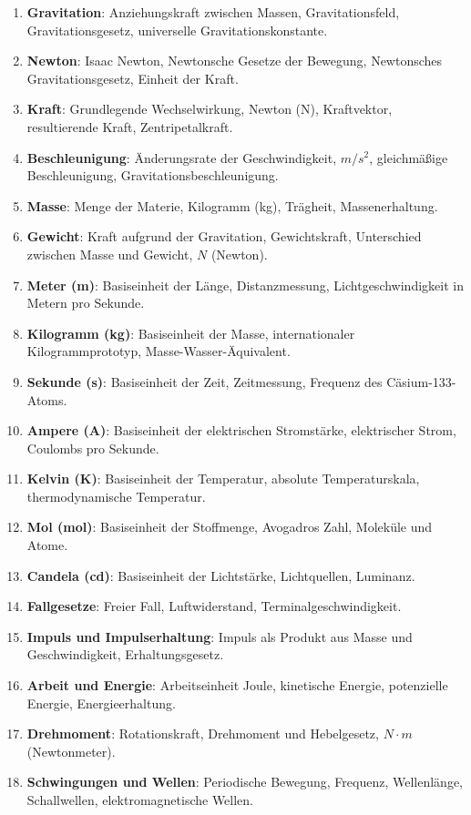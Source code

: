 \documentclass{vorlage-design-main}
\begin{document}
\begin{enumerate}
\def\labelenumi{\arabic{enumi}.}

\item
  \textbf{Gravitation}: Anziehungskraft zwischen Massen,
  Gravitationsfeld, Gravitationsgesetz, universelle
  Gravitationskonstante.
\item
  \textbf{Newton}: Isaac Newton, Newtonsche Gesetze der Bewegung,
  Newtonsches Gravitationsgesetz, Einheit der Kraft.
\item
  \textbf{Kraft}: Grundlegende Wechselwirkung, Newton (N), Kraftvektor,
  resultierende Kraft, Zentripetalkraft.
\item
  \textbf{Beschleunigung}: Änderungsrate der Geschwindigkeit, $m/s^2$,
  gleichmäßige Beschleunigung, Gravitationsbeschleunigung.
\item
  \textbf{Masse}: Menge der Materie, Kilogramm (kg), Trägheit,
  Massenerhaltung.
\item
  \textbf{Gewicht}: Kraft aufgrund der Gravitation, Gewichtskraft,
  Unterschied zwischen Masse und Gewicht, $N$ (Newton).
\item
  \textbf{Meter (m)}: Basiseinheit der Länge, Distanzmessung,
  Lichtgeschwindigkeit in Metern pro Sekunde.
\item
  \textbf{Kilogramm (kg)}: Basiseinheit der Masse, internationaler
  Kilogrammprototyp, Masse-Wasser-Äquivalent.
\item
  \textbf{Sekunde (s)}: Basiseinheit der Zeit, Zeitmessung, Frequenz des
  Cäsium-133-Atoms.
\item
  \textbf{Ampere (A)}: Basiseinheit der elektrischen Stromstärke,
  elektrischer Strom, Coulombs pro Sekunde.
\item
  \textbf{Kelvin (K)}: Basiseinheit der Temperatur, absolute
  Temperaturskala, thermodynamische Temperatur.
\item
  \textbf{Mol (mol)}: Basiseinheit der Stoffmenge, Avogadros Zahl,
  Moleküle und Atome.
\item
  \textbf{Candela (cd)}: Basiseinheit der Lichtstärke, Lichtquellen,
  Luminanz.
\item
  \textbf{Fallgesetze}: Freier Fall, Luftwiderstand,
  Terminalgeschwindigkeit.
\item
  \textbf{Impuls und Impulserhaltung}: Impuls als Produkt aus Masse und
  Geschwindigkeit, Erhaltungsgesetz.
\item
  \textbf{Arbeit und Energie}: Arbeitseinheit Joule, kinetische Energie,
  potenzielle Energie, Energieerhaltung.
\item
  \textbf{Drehmoment}: Rotationskraft, Drehmoment und Hebelgesetz,
  $N\cdot m$ (Newtonmeter).
\item
  \textbf{Schwingungen und Wellen}: Periodische Bewegung, Frequenz,
  Wellenlänge, Schallwellen, elektromagnetische Wellen.
\end{enumerate}
\end{document}
